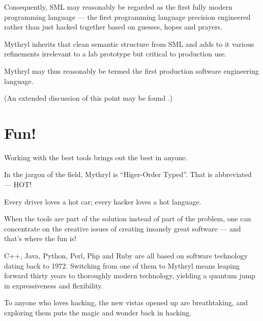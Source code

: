 Consequently, {\sc SML} may reasonably be regarded as the first fully modern 
programming language --- the first programming language precision engineered 
rather than just hacked together based on guesses, hopes and prayers.

Mythryl inherits that clean semantic structure from {\sc SML} and adds to it 
various refinements irrelevant to a lab prototype but critical to production 
use.

Mythryl may thus reasonably be termed the first production software engineering language.

(An extended discussion of this point may be found 
.)

\section{Fun!}

Working with the best tools brings out the best in anyone.

In the jargon of the field, Mythryl is ``Higer-Order Typed''. That is abbreviated --- {\sc HOT}!

Every driver loves a hot car; every hacker loves a hot language.

When the tools are part of the solution instead of part of the problem, 
one can concentrate on the creative issues of creating insanely great software 
--- and that's where the fun is!

C++, Java, Python, Perl, Php and Ruby are all based on software technology 
dating back to 1972.  Switching from one of them to Mythryl means leaping 
forward thirty years to thoroughly modern technology, yielding a quantum 
jump in expressiveness and flexibility.

To anyone who loves hacking, the new vistas opened up are 
breathtaking, and exploring them puts the magic and wonder back in 
hacking.

